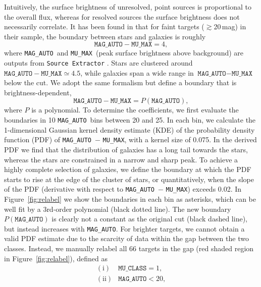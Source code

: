 \documentclass[twocolumn,tighten]{aastex631}
\newcommand{\magauto}{\texttt{MAG\_AUTO}}
\newcommand{\mumax}{\texttt{MU\_MAX}}
\begin{document}
\begin{CJK*}{UTF8}{gbsn}
Intuitively, the surface brightness of unresolved, point sources is proportional to the overall flux, whereas for resolved sources the surface brightness does not necessarily correlate. It has been found in \cite{Leauthaud_2007} that for faint targets ($\gtrsim$20\,mag) in their sample, the boundary between stars and galaxies is roughly
\begin{equation*}
\texttt{MAG\_AUTO} - \texttt{MU\_MAX} = 4,
\end{equation*}
where \magauto\ and \mumax\ (peak surface brightness above background) are outputs from \texttt{Source Extractor} \citep{SExtractor_1996}. Stars are clustered around $\texttt{MAG\_AUTO} - \texttt{MU\_MAX} \simeq 4.5$, while galaxies span a wide range in $\texttt{MAG\_AUTO} - \texttt{MU\_MAX}$ below the cut. We adopt the same formalism but define a boundary that is brightness-dependent,
\begin{equation}\label{eq:bd}
    \texttt{MAG\_AUTO} - \texttt{MU\_MAX} = P(\texttt{MAG\_AUTO}),
\end{equation}
where $P$ is a polynomial. To determine the coefficients, we first evaluate the boundaries in 10 \magauto\ bins between 20 and 25. In each bin, we calculate the 1-dimensional Gaussian kernel density estimate (KDE) of the probability density function (PDF) of \magauto\ $-$ \mumax, with a kernel size of 0.075. In the derived PDF we find that the distribution of galaxies has a long tail towards the stars, whereas the stars are constrained in a narrow and sharp peak. To achieve a highly complete selection of galaxies, we define the boundary at which the PDF starts to rise at the edge of the cluster of stars, or quantitatively, when the slope of the PDF (derivative with respect to \magauto\ $-$ \mumax) exceeds 0.02. In Figure~\ref{fig:relabel} we show the boundaries in each bin as asterisks, which can be well fit by a 3rd-order polynomial (black dotted line). The new boundary $P(\texttt{MAG\_AUTO})$ is clearly not a constant as the original cut (black dashed line), but instead increases with \magauto. For brighter targets, we cannot obtain a valid PDF estimate due to the scarcity of data within the gap between the two classes. Instead, we manually relabel all 66 targets in the gap (red shaded region in Figure~\ref{fig:relabel}), defined as
\begin{equation}\label{eq:VI}
    \left.\begin{array}{cc}
         \mathrm{(i)} & \texttt{MU\_CLASS} = 1,\\
         \mathrm{(ii)} & \texttt{MAG\_AUTO} < 20,\\

\end{array}
\end{equation}
\end{CJK*}
\end{document}
